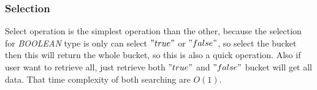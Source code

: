 \subsubsection{Selection}

Select operation is the simplest operation than the other, because the selection for \textit{BOOLEAN} type is only can select $"true"$ or $"false"$, so select the bucket then this will return the whole bucket, so this is also a quick operation. Also if user want to retrieve all, just retrieve both $"true"$ and $"false"$ bucket will get all data. That time complexity of both searching are $O(1)$.
